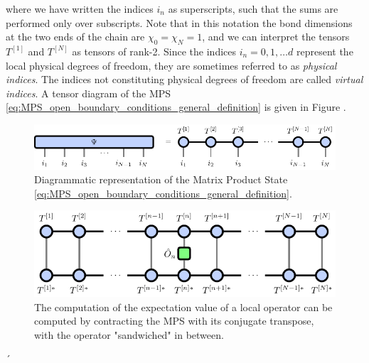 where we have written the indices $i_n$ as superscripts, such that the sums are performed only over subscripts. Note that in this notation the bond dimensions at the two ends of the chain are $\chi_0 = \chi_{N} = 1$, and we can interpret the tensors $T^{[1]}$ and $T^{[N]}$ as tensors of rank-2. Since the indices $i_n = 0, 1, \dots d$ represent the local physical degrees of freedom, they are sometimes referred to as \textit{physical indices}. The indices not constituting physical degrees of freedom are called \textit{virtual indices}. A tensor diagram of the MPS \eqref{eq:MPS_open_boundary_conditions_general_definition} is given in Figure .\par
\begin{figure}
	\centering
	\includegraphics[scale=1]{figures/tikz/Tensor_Networks/mps_basic/mps_basic.pdf}
	\caption{Diagrammatic representation of the Matrix Product State \ref{eq:MPS_open_boundary_conditions_general_definition}.}
	\label{fig:mps_general}
\end{figure}
\begin{figure}
\centering
\includegraphics[scale=1]{figures/tikz/Tensor_Networks/mps_local_expectation_value/mps_local_expectation_value.pdf}
\caption{The computation of the expectation value of a local operator can be computed by contracting the MPS with its conjugate transpose, with the operator "sandwiched" in between.}
\label{fig:mps_local_expectation_value}
\end{figure}´
